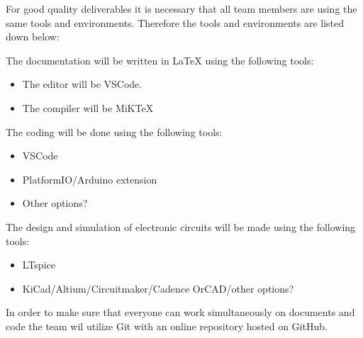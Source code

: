 For good quality deliverables it is necessary that all team members are using the same tools and environments. Therefore the tools and environments are listed down below:

The documentation will be written in LaTeX using the following tools:
\begin{itemize} 
    \setlength\itemsep{-0.3em}
    \item The editor will be VSCode.
    \item The compiler will be MiKTeX
\end{itemize}

The coding will be done using the following tools:
\begin{itemize}
    \item VSCode
    \item PlatformIO/Arduino extension
    \item Other options?
\end{itemize}

The design and simulation of electronic circuits will be made using the following tools:
\begin{itemize}
    \item LTspice
    \item KiCad/Altium/Circuitmaker/Cadence OrCAD/other options?
\end{itemize}

In order to make sure that everyone can work simultaneously on documents and code the team wil utilize Git with an online repository hosted on GitHub.